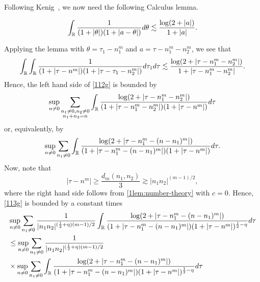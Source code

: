 %
%
Following Kenig~\cite{Kenig:1996aa}, we now need the following Calculus lemma.
%
%
%
%
%
%
%
%
\begin{lemma}
	\label{1lem:calc}
 \begin{equation}
	 \label{1calc}
	 \begin{split}
		 \int_{\mathbb{R}} \frac{1}{(1 + | \theta |)(1 + | a - \theta |)} d \theta \lesssim
		 \frac{\log(2 + | a |)}{1 + | a |}.
	 \end{split}
 \end{equation}
 \end{lemma}
%
%
Applying the lemma with $\theta = \tau_1 - n_1^m$ and $a = \tau - n_1^m -
n_2^m$, we see that
%
%
\begin{equation*}
	\begin{split}
	\int_{\mathbb{R}}
		\int_{\mathbb{R}}  \frac{1}{(1 + | \tau - n^m |)(1 + | \tau - \tau_1 -
		n_2^m |)} d \tau_1 d \tau \lesssim \frac{\log(2 + | \tau - n_{1}^m -
		n_{2}^m |)}{1 + | \tau - n_{1}^m - n_{2}^m |}.
	\end{split}
\end{equation*}
%
%
%
Hence, the left hand side of \eqref{112g} is bounded by
%
\begin{equation*}
	\begin{split}
		\sup_{n \neq 0} \sum_{\substack{n_1 \neq 0, n_2 \neq 0 \\n_1 +n_2 =n}}
		\int_{\mathbb{R}} \frac{\log(2 + | \tau - n_{1}^m -
		n_{2}^m |)}{(1 + | \tau - n_{1}^m - n_{2}^m |)(1 + | \tau - n^m |)}
		d \tau	
	\end{split}
\end{equation*}
%
%
or, equivalently, by
%
%
\begin{equation}
	\label{113g}
	\begin{split}
		\sup_{n \neq 0} \sum_{n_1 \neq 0} \int_{\mathbb{R}} \frac{\log(2 + | \tau -
		n_{1}^m - (n - n_1)^m |)}{(1 + | \tau - n_{1}^m - (n - n_{1})^m |)(1
		+ | \tau - n^m |)} d \tau.
	\end{split}
\end{equation}
%
%
%
Now, note that 
$$ |\tau - n^m| \ge \frac{d_m(n_1, n_2)}{3} \gtrsim
| n_1 n_2 |^{(m-1)/2},$$ where the right hand side follows from
\cref{1lem:number-theory} with $c=0$. Hence, \eqref{113g} is bounded by a constant times
%
%
%
%
\begin{equation}
	\label{114g}
	\begin{split}
		& \sup_{n \neq 0} \sum_{n_1 \neq 0}
		\frac{1}{| n_1 n_2 |^{(\frac{1}{2} + \eta)(m-1)/2}} \int_{\mathbb{R}} \frac{\log(2 + | \tau - n_{1}^m -
		(n - n_1)^m |)}{(1 + | \tau - n_{1}^m - (n - n_{1})^m
		|)(1 + | \tau - n^m |)^{\frac{1}{2}-\eta}}
		d \tau
		\\
		& \le \sup_{n \neq 0} \sum_{n_1 \neq 0}
		\frac{1}{| n_1 n_2 |^{(\frac{1}{2} + \eta)(m-1)/2}} 	\\
		& \times \sup_{n \neq 0} \sum_{n_1 \neq 0}
		\int_{\mathbb{R}} \frac{\log(2 + | \tau
		- n_{1}^m - (n - n_1)^m |)}{(1 + | \tau - n_{1}^m - (n - n_{1})^m
		|)(1 + | \tau - n^m |)^{\frac{1}{2}-\eta}}
		d \tau
	\end{split}
\end{equation}
